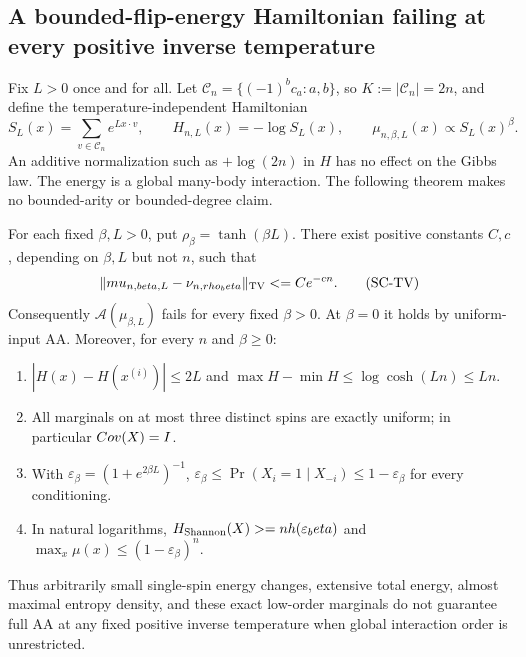 \subsection{A bounded-flip-energy Hamiltonian failing at every positive inverse temperature}
\label{threshold:fixed-soft-code}

Fix $L>0$ once and for all.  Let $\mathcal C_n=\{(-1)^bc_a:a,b\}$,
so $K:=|\mathcal C_n|=2n$, and define the temperature-independent
Hamiltonian
\[
 S_L(x)=\sum_{v\in\mathcal C_n}e^{Lx\cdot v},
 \qquad H_{n,L}(x)=-\log S_L(x),
 \qquad \mu_{n,\beta,L}(x)\propto S_L(x)^\beta.
 \tag{SC}
\]
An additive normalization such as $+\log(2n)$ in $H$ has no effect on
the Gibbs law.  The energy is a global many-body interaction.  The
following theorem makes no bounded-arity or bounded-degree claim.

\begin{theorem}
\label{threshold:soft-code-theorem}
For each fixed $\beta,L>0$, put $\rho_\beta=\tanh(\beta L)$.  There
exist positive constants $C,c$, depending on $\beta,L$ but not $n$, such
that
\[
 \|\mu_{n,\beta,L}-\nu_{n,\rho_\beta}\|_{\rm TV}\le Ce^{-cn}.
 \tag{SC-TV}
\]
Consequently $\mathcal A(\mu_{\beta,L})$ fails for every fixed
$\beta>0$.  At $\beta=0$ it holds by uniform-input AA.  Moreover, for
every $n$ and $\beta\ge0$:
\begin{enumerate}
\item $|H(x)-H(x^{(i)})|\le2L$ and
      $\max H-\min H\le\log\cosh(Ln)\le Ln$.
\item All marginals on at most three distinct spins are exactly uniform;
      in particular $\Cov(X)=I$.
\item With $\varepsilon_\beta=(1+e^{2\beta L})^{-1}$,
      $\varepsilon_\beta\le\Pr(X_i=1\mid X_{-i})\le1-\varepsilon_\beta$
      for every conditioning.
\item In natural logarithms,
      $H_{\rm Shannon}(X)\ge n h(\varepsilon_\beta)$ and
      $\max_x\mu(x)\le(1-\varepsilon_\beta)^n$.
\end{enumerate}
Thus arbitrarily small single-spin energy changes, extensive total
energy, almost maximal entropy density, and these exact low-order
marginals do not guarantee full AA at any fixed positive inverse
temperature when global interaction order is unrestricted.
\end{theorem}

